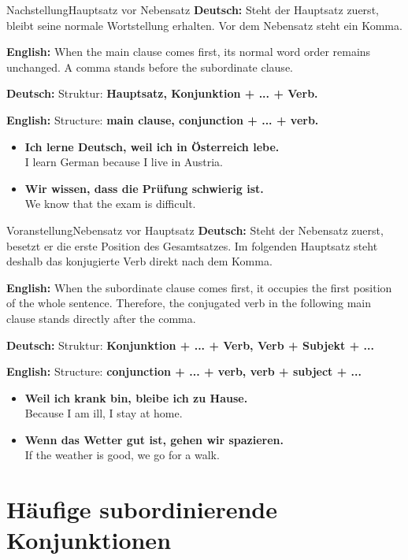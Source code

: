 \documentclass[a4paper,11pt]{article}
\newcommand{\GermanText}[1]{\textbf{Deutsch: }#1\par}
\newcommand{\EnglishText}[1]{{\small\color{SoftGray}\textbf{English: }#1\par}}
\newcommand{\ExampleItem}[2]{\item \textbf{#1}\\{\small\color{SoftGray}#2}}
\begin{document}
\begin{grammarentry}{Nachstellung}{Hauptsatz vor Nebensatz}
\GermanText{Steht der Hauptsatz zuerst, bleibt seine normale Wortstellung erhalten. Vor dem Nebensatz steht ein Komma.}
\EnglishText{When the main clause comes first, its normal word order remains unchanged. A comma stands before the subordinate clause.}

\GermanText{Struktur: \textbf{Hauptsatz, Konjunktion + ... + Verb.}}
\EnglishText{Structure: \textbf{main clause, conjunction + ... + verb.}}
\end{grammarentry}

\begin{exbox}
\begin{itemize}
\ExampleItem{Ich lerne Deutsch, weil ich in Österreich lebe.}{I learn German because I live in Austria.}
\ExampleItem{Wir wissen, dass die Prüfung schwierig ist.}{We know that the exam is difficult.}
\end{itemize}
\end{exbox}

\begin{grammarentry}{Voranstellung}{Nebensatz vor Hauptsatz}
\GermanText{Steht der Nebensatz zuerst, besetzt er die erste Position des Gesamtsatzes. Im folgenden Hauptsatz steht deshalb das konjugierte Verb direkt nach dem Komma.}
\EnglishText{When the subordinate clause comes first, it occupies the first position of the whole sentence. Therefore, the conjugated verb in the following main clause stands directly after the comma.}

\GermanText{Struktur: \textbf{Konjunktion + ... + Verb, Verb + Subjekt + ...}}
\EnglishText{Structure: \textbf{conjunction + ... + verb, verb + subject + ...}}
\end{grammarentry}

\begin{exbox}
\begin{itemize}
\ExampleItem{Weil ich krank bin, bleibe ich zu Hause.}{Because I am ill, I stay at home.}
\ExampleItem{Wenn das Wetter gut ist, gehen wir spazieren.}{If the weather is good, we go for a walk.}
\end{itemize}
\end{exbox}

\section{Häufige subordinierende Konjunktionen}
\end{document}
